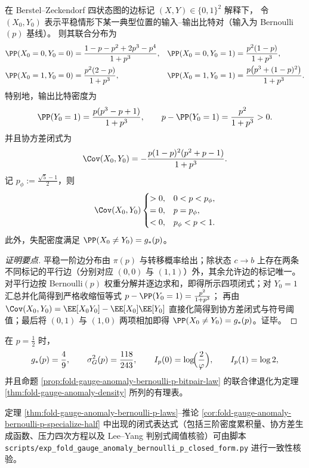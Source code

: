 \begin{proposition}\label{prop:fold-gauge-anomaly-bernoulli-p-bitpair-law}
在 Berstel--Zeckendorf 四状态图的边标记 \((X,Y)\in\{0,1\}^2\) 解释下，
令 \((X_0,Y_0)\) 表示平稳情形下某一典型位置的输入--输出比特对（输入为 Bernoulli\((p)\) 基线）。
则其联合分布为
\begin{align*}
\PP(X_0=0,Y_0=0)&=\frac{1 - p - p^2 + 2p^3 - p^4}{1+p^3},&
\PP(X_0=0,Y_0=1)&=\frac{p^2(1-p)}{1+p^3},\\
\PP(X_0=1,Y_0=0)&=\frac{p^2(2-p)}{1+p^3},&
\PP(X_0=1,Y_0=1)&=\frac{p\bigl(p^3+(1-p)^2\bigr)}{1+p^3}.
\end{align*}
特别地，输出比特密度为
\[
\PP(Y_0=1)=\frac{p(p^3-p+1)}{1+p^3},
\qquad
p-\PP(Y_0=1)=\frac{p^2}{1+p^3}>0.
\]
并且协方差闭式为
\[
\Cov(X_0,Y_0)
=-\frac{p(1-p)^2(p^2+p-1)}{1+p^3}.
\]
记 \(p_\phi:=\frac{\sqrt5-1}{2}\)，则
\[
\Cov(X_0,Y_0)
\begin{cases}
>0,& 0<p<p_\phi,\\
=0,& p=p_\phi,\\
<0,& p_\phi<p<1.
\end{cases}
\]
此外，失配密度满足 \(\PP(X_0\neq Y_0)=g_\ast(p)\)。
\end{proposition}
\begin{proof}[证明要点]
平稳一阶边分布由 \(\pi(p)\) 与转移概率给出；除状态 \(c\to b\) 上存在两条不同标记的平行边（分别对应 \((0,0)\) 与 \((1,1)\)）外，其余允许边的标记唯一。
对平行边按 Bernoulli\((p)\) 权重分解并逐边求和，即得所示四项闭式；对 \(Y_0=1\) 汇总并化简得到严格收缩恒等式
\(p-\PP(Y_0=1)=\frac{p^2}{1+p^3}\)；
再由 \(\Cov(X_0,Y_0)=\EE[X_0Y_0]-\EE[X_0]\EE[Y_0]\) 直接化简得到协方差闭式与符号阈值；最后将 \((0,1)\) 与 \((1,0)\) 两项相加即得 \(\PP(X_0\neq Y_0)=g_\ast(p)\)。证毕。
\end{proof}

\begin{corollary}[均匀基线作为特例：\texorpdfstring{$p=\tfrac12$}{p=1/2}]\label{cor:fold-gauge-anomaly-bernoulli-p-specialize-half}
在 \(p=\tfrac12\) 时，
\[
g_\ast(p)=\frac49,\qquad \sigma_G^2(p)=\frac{118}{243},
\qquad
I_p(0)=\log\!\Bigl(\frac{2}{\varphi}\Bigr),\qquad I_p(1)=\log 2,
\]
并且命题 \ref{prop:fold-gauge-anomaly-bernoulli-p-bitpair-law} 的联合律退化为定理 \ref{thm:fold-gauge-anomaly-density} 所列的有理表。
\end{corollary}



\begin{remark}[审计脚本]\label{rem:fold-gauge-anomaly-bernoulli-p-audit-script}
定理 \ref{thm:fold-gauge-anomaly-bernoulli-p-laws}--推论 \ref{cor:fold-gauge-anomaly-bernoulli-p-specialize-half} 中出现的闭式表达式（包括三阶密度累积量、协方差生成函数、压力四次方程以及 Lee--Yang 判别式阈值核验）可由脚本 \texttt{scripts/exp\_fold\_gauge\_anomaly\_bernoulli\_p\_closed\_form.py} 进行一致性核验。
\end{remark}
\endinput
